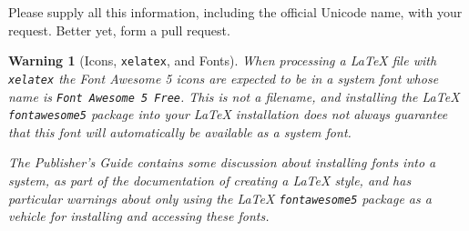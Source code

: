 \documentclass[pdflatex]{sn-jnl}
\theoremstyle{thmstyleone}%
\theoremstyle{thmstyletwo}%
\theoremstyle{thmstylethree}%
\newtheorem{warning}[theorem]{Warning}
\newcommand{\mono}[1]{\texttt{#1}}
\numberwithin{equation}{section}
\begin{document}
Please supply all this information, including the official Unicode name, with your request.  Better yet, form a pull request.%
\begin{warning}[Icons, \mono{xelatex}, and Fonts]\label{subsection-icons-in-text-7}%
%
When processing a \LaTeX{} file with \mono{xelatex} the Font Awesome 5 icons are expected to be in a \emph{system} font whose name is \mono{Font Awesome 5 Free}.  This is not a filename, and installing the \LaTeX{} \mono{fontawesome5} package into your \LaTeX{} installation does not always guarantee that this font will automatically be available as a \emph{system} font.%
\par
The Publisher's Guide contains some discussion about installing fonts into a system, as part of the documentation of creating a \LaTeX{} style, and has particular warnings about only using the \LaTeX{} \mono{fontawesome5} package as a vehicle for installing and accessing these fonts.%
\end{warning}
%
%
\typeout{************************************************}
\typeout{************************************************}
%
\end{document}
